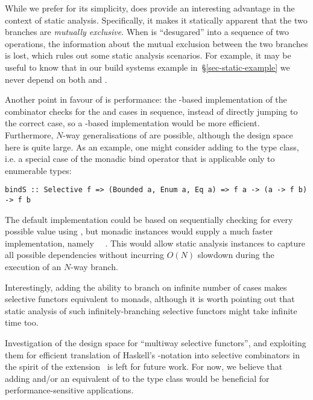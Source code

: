 \noindent
While we prefer  for its simplicity,  does provide an
interesting advantage in the context of static analysis. Specifically, it makes
it statically apparent that the two branches are \emph{mutually exclusive}. When
 is ``desugared'' into a sequence of two  operations, the
information about the mutual exclusion between the two branches is lost, which
rules out some static analysis scenarios. For example, it may be useful to know
that in our build systems example in~\S\ref{sec-static-example} we never depend
on both  and .

Another point in favour of  is performance: the -based
implementation of the  combinator checks for the  and
 cases in sequence, instead of directly jumping to the correct case,
so a -based implementation would be more efficient. Furthermore,
$N$-way generalisations of  are possible, although the design space
here is quite large. As an example, one might consider adding  to the
 type class, i.e. a special case of the monadic bind operator that
is applicable only to enumerable types:

\vspace{1mm}
\begin{verbatim}
bindS :: Selective f => (Bounded a, Enum a, Eq a) => f a -> (a -> f b) -> f b
\end{verbatim}
\vspace{1mm}

\noindent
The default implementation could be based on sequentially checking for every
possible value using , but monadic instances would supply a much
faster implementation, namely ~\hs{=}~\hs{(>>=)}. This would allow
static analysis instances to capture all possible dependencies without incurring
$O(N)$ slowdown during the execution of an $N$-way branch.

Interestingly, adding the ability to branch on infinite number of cases makes
selective functors equivalent to monads, although it is worth pointing out that
static analysis of such infinitely-branching selective functors might take
infinite time too.

Investigation of the design space for ``multiway selective functors'', and
exploiting them for efficient translation of Haskell's -notation into
selective combinators in the spirit of the 
extension~\citep{marlow2016applicativedo} is left for future work. For now, we
believe that adding  and/or an equivalent of  to the
 type class would be beneficial for performance-sensitive
applications.

